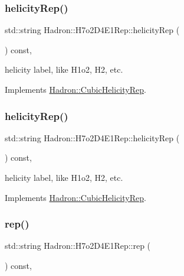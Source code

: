 \subsubsection{\texorpdfstring{helicityRep()}{helicityRep()}\hspace{0.1cm}{\footnotesize\ttfamily [2/3]}}
{\footnotesize\ttfamily std\+::string Hadron\+::\+H7o2\+D4\+E1\+Rep\+::helicity\+Rep (\begin{DoxyParamCaption}{ }\end{DoxyParamCaption}) const\hspace{0.3cm}{\ttfamily [inline]}, {\ttfamily [virtual]}}

helicity label, like H1o2, H2, etc. 

Implements \mbox{\hyperlink{structHadron_1_1CubicHelicityRep_af1096946b7470edf0a55451cc662f231}{Hadron\+::\+Cubic\+Helicity\+Rep}}.

\mbox{\label{structHadron_1_1H7o2D4E1Rep_adb6d012951f61d6cf35b8c9ad1df0435}} 
\subsubsection{\texorpdfstring{helicityRep()}{helicityRep()}\hspace{0.1cm}{\footnotesize\ttfamily [3/3]}}
{\footnotesize\ttfamily std\+::string Hadron\+::\+H7o2\+D4\+E1\+Rep\+::helicity\+Rep (\begin{DoxyParamCaption}{ }\end{DoxyParamCaption}) const\hspace{0.3cm}{\ttfamily [inline]}, {\ttfamily [virtual]}}

helicity label, like H1o2, H2, etc. 

Implements \mbox{\hyperlink{structHadron_1_1CubicHelicityRep_af1096946b7470edf0a55451cc662f231}{Hadron\+::\+Cubic\+Helicity\+Rep}}.

\mbox{\label{structHadron_1_1H7o2D4E1Rep_ae6cc5dc38275bfce35b58694bc85cfe1}} 
\subsubsection{\texorpdfstring{rep()}{rep()}\hspace{0.1cm}{\footnotesize\ttfamily [1/5]}}
{\footnotesize\ttfamily std\+::string Hadron\+::\+H7o2\+D4\+E1\+Rep\+::rep (\begin{DoxyParamCaption}{ }\end{DoxyParamCaption}) const\hspace{0.3cm}{\ttfamily [inline]}, {\ttfamily [virtual]}}




